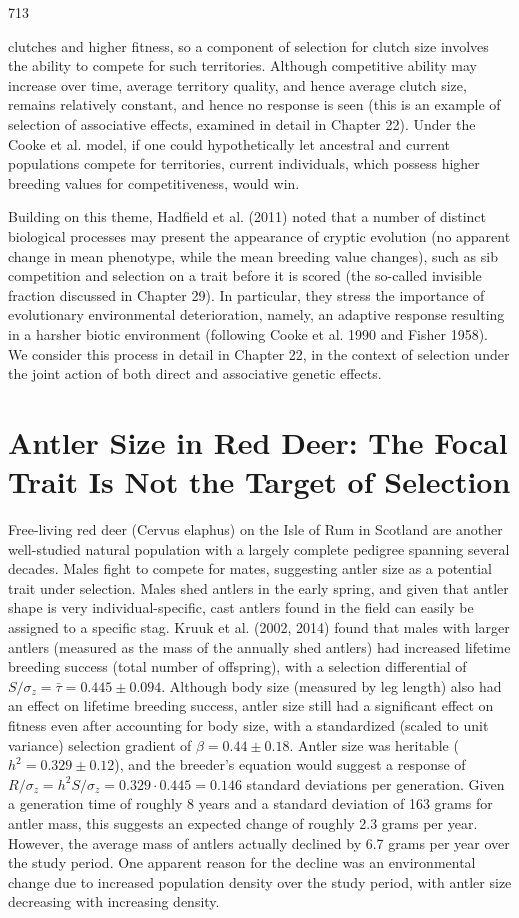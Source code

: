 \documentclass{article}
\begin{document}
713

clutches and higher fitness, so a component of selection for clutch size involves the ability to compete for such territories. Although competitive ability may increase over time, average territory quality, and hence average clutch size, remains relatively constant, and hence no response is seen (this is an example of selection of associative effects, examined in detail in Chapter 22). Under the Cooke et al. model, if one could hypothetically let ancestral and current populations compete for territories, current individuals, which possess higher breeding values for competitiveness, would win.

Building on this theme, Hadfield et al. (2011) noted that a number of distinct biological processes may present the appearance of cryptic evolution (no apparent change in mean phenotype, while the mean breeding value changes), such as sib competition and selection on a trait before it is scored (the so-called invisible fraction discussed in Chapter 29). In particular, they stress the importance of evolutionary environmental deterioration, namely, an adaptive response resulting in a harsher biotic environment (following Cooke et al. 1990 and Fisher 1958). We consider this process in detail in Chapter 22, in the context of selection under the joint action of both direct and associative genetic effects.

\section{Antler Size in Red Deer: The Focal Trait Is Not the Target of Selection}
Free-living red deer (Cervus elaphus) on the Isle of Rum in Scotland are another well-studied natural population with a largely complete pedigree spanning several decades. Males fight to compete for mates, suggesting antler size as a potential trait under selection. Males shed antlers in the early spring, and given that antler shape is very individual-specific, cast antlers found in the field can easily be assigned to a specific stag. Kruuk et al. (2002, 2014) found that males with larger antlers (measured as the mass of the annually shed antlers) had increased lifetime breeding success (total number of offspring), with a selection differential of  $ S/\sigma_z = \bar{\tau} = 0.445 \pm 0.094 $. Although body size (measured by leg length) also had an effect on lifetime breeding success, antler size still had a significant effect on fitness even after accounting for body size, with a standardized (scaled to unit variance) selection gradient of  $ \beta = 0.44 \pm 0.18 $. Antler size was heritable ( $ h^2 = 0.329 \pm 0.12 $), and the breeder's equation would suggest a response of  $ R/\sigma_z = h^2 S/\sigma_z = 0.329 \cdot 0.445 = 0.146 $ standard deviations per generation. Given a generation time of roughly 8 years and a standard deviation of 163 grams for antler mass, this suggests an expected change of roughly 2.3 grams per year. However, the average mass of antlers actually declined by 6.7 grams per year over the study period. One apparent reason for the decline was an environmental change due to increased population density over the study period, with antler size decreasing with increasing density.
\end{document}
